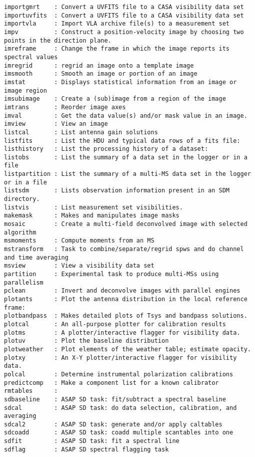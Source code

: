 \begin{verbatim}
importgmrt    : Convert a UVFITS file to a CASA visibility data set
importuvfits  : Convert a UVFITS file to a CASA visibility data set
importvla     : Import VLA archive file(s) to a measurement set
impv          : Construct a position-velocity image by choosing two points in the direction plane.
imreframe     : Change the frame in which the image reports its spectral values
imregrid      : regrid an image onto a template image
imsmooth      : Smooth an image or portion of an image
imstat        : Displays statistical information from an image or image region
imsubimage    : Create a (sub)image from a region of the image
imtrans       : Reorder image axes
imval         : Get the data value(s) and/or mask value in an image.
imview        : View an image
listcal       : List antenna gain solutions
listfits      : List the HDU and typical data rows of a fits file:
listhistory   : List the processing history of a dataset:
listobs       : List the summary of a data set in the logger or in a file
listpartition : List the summary of a multi-MS data set in the logger or in a file
listsdm       : Lists observation information present in an SDM directory.
listvis       : List measurement set visibilities.
makemask      : Makes and manipulates image masks
mosaic        : Create a multi-field deconvolved image with selected algorithm
msmoments     : Compute moments from an MS
mstransform   : Task to combine/separate/regrid spws and do channel and time averaging
msview        : View a visibility data set
partition     : Experimental task to produce multi-MSs using parallelism
pclean        : Invert and deconvolve images with parallel engines
plotants      : Plot the antenna distribution in the local reference frame:
plotbandpass  : Makes detailed plots of Tsys and bandpass solutions.
plotcal       : An all-purpose plotter for calibration results 
plotms        : A plotter/interactive flagger for visibility data.
plotuv        : Plot the baseline distribution
plotweather   : Plot elements of the weather table; estimate opacity.
plotxy        : An X-Y plotter/interactive flagger for visibility data.
polcal        : Determine instrumental polarization calibrations
predictcomp   : Make a component list for a known calibrator
rmtables      : 
sdbaseline    : ASAP SD task: fit/subtract a spectral baseline 
sdcal         : ASAP SD task: do data selection, calibration, and averaging
sdcal2        : ASAP SD task: generate and/or apply caltables
sdcoadd       : ASAP SD task: coadd multiple scantables into one
sdfit         : ASAP SD task: fit a spectral line
sdflag        : ASAP SD spectral flagging task 

\end{verbatim}
